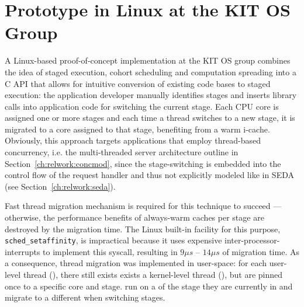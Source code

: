 \documentclass[12pt,a4paper]{book}
\begin{document}
\section{Prototype in Linux at the KIT OS Group}\label{ch:relwork:kitpoc}
\NewDocumentCommand{\klt}{}{\textsc{klt}\xspace}
\NewDocumentCommand{\klts}{}{\textsc{klt}s\xspace}
\NewDocumentCommand{\ult}{}{\textsc{ult}\xspace}
\NewDocumentCommand{\ults}{}{\textsc{ult}s\xspace}
A Linux-based proof-of-concept implementation at the KIT OS group combines the idea of staged execution, cohort scheduling and computation spreading into a C API that allows for intuitive conversion of existing code bases to staged execution:
the application developer manually identifies stages and inserts library calls into application code for switching the current stage.
Each CPU core is assigned one or more stages and each time a thread switches to a new stage, it is migrated to a core assigned to that stage, benefiting from a warm i-cache.
Obviously, this approach targets applications that employ thread-based concurrency, i.e. the multi-threaded server architecture outline in Section~\ref{ch:relwork:concmod}, since the stage-switching is embedded into the control flow of the request handler and thus not explicitly modeled like in SEDA (see Section~\ref{ch:relwork:seda}).

Fast thread migration mechanism is required for this technique to succeed
--- otherwise, the performance benefits of always-warm caches per stage are destroyed by the migration time.
The Linux built-in facility for this purpose, \texttt{sched\_setaffinity}, is impractical because it uses
expensive inter-processor-interrupts to implement this syscall, resulting in $9\mu s$ -- $14\mu s$ of migration time.
As a consequence, thread migration was implemented in user-space:
for each user-level thread (\ult), there still exists exists a kernel-level thread (\klt),
but \klts are pinned once to a specific core and stage.
\ults run on a \klt of the stage they are currently in and migrate to a different \klt when switching stages.~\cite{sodaspr}%
\end{document}
